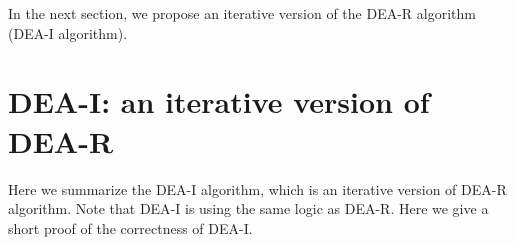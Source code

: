 \documentclass[pdflatex,sn-mathphys-num]{sn-jnl}%
\theoremstyle{thmstyleone}%
\theoremstyle{thmstyletwo}%
\theoremstyle{thmstylethree}%
\begin{document}
In the next section, we propose an iterative version of the DEA-R algorithm (DEA-I algorithm).
\section{DEA-I: an iterative version of DEA-R}\label{secDEAI} Here we summarize the DEA-I algorithm, which is an iterative version of DEA-R algorithm. Note that DEA-I is using the same logic as DEA-R. Here we give a short proof of the correctness of DEA-I. 


\begin{algorithm}
\caption{\textbf{DEA-I} Iterative version of algorithm 1 to solve 2-variable Linear Diophantine equation}



 


















\end{algorithm}
\end{document}
